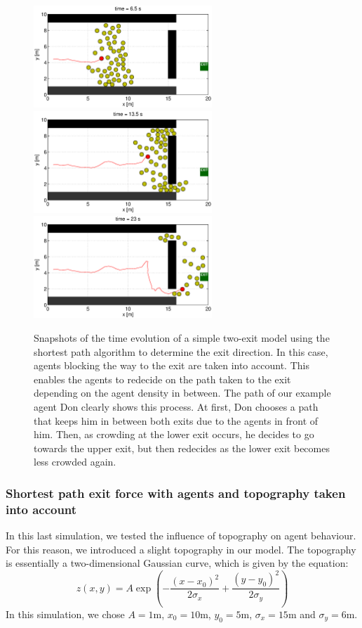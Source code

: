 \documentclass[11pt]{article}
\begin{document}
\begin{figure}
	\centering
	\includegraphics[width=0.6\textwidth]{figures/TwoExitsShortestPathWithAgents_000650.eps}
	\qquad
	\includegraphics[width=0.6\textwidth]{figures/TwoExitsShortestPathWithAgents_001350.eps}
	\qquad
	\includegraphics[width=0.6\textwidth]{figures/TwoExitsShortestPathWithAgents_002300.eps}
	\caption{Snapshots of the time evolution of a simple two-exit model using the shortest path algorithm to determine the exit direction. In this case, agents blocking the way to the exit are taken into account. This enables the agents to redecide on the path taken to the exit depending on the agent density in between. The path of our example agent Don clearly shows this process. At first, Don chooses a path that keeps him in between both exits due to the agents in front of him. Then, as crowding at the lower exit occurs, he decides to go towards the upper exit, but then redecides as the lower exit becomes less crowded again.}
	\label{fig:two_exits2}
\end{figure}
\subsubsection{Shortest path exit force with agents and topography taken into account}
In this last simulation, we tested the influence of topography on agent behaviour. For this reason, we introduced a slight topography in our model. The topography is essentially a two-dimensional Gaussian curve, which is given by the equation:
\begin{equation}
	z(x,y) = A\exp \left(- \frac{\left(x-x_0\right)^2}{2\sigma_x} + \frac{\left(y-y_0\right)^2}{2\sigma_y}\right)
\end{equation}
In this simulation, we chose $A = 1 $m, $x_0 = 10$m, $y_0 = 5$m, $\sigma_x = 15$m and $\sigma_y = 6$m.
\end{document}
